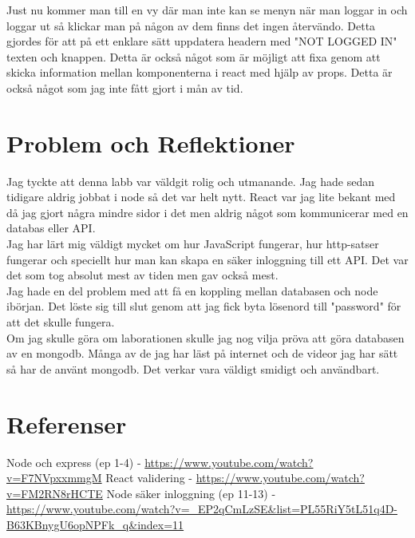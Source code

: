 \documentclass{article}
\begin{document}
\noindent
Just nu kommer man till en vy där man inte kan se menyn när man loggar in och loggar ut så klickar man på någon av dem finns det ingen återvändo. Detta gjordes för att på ett enklare sätt uppdatera headern med "NOT LOGGED IN" texten och knappen. Detta är också något som är möjligt att fixa genom att skicka information mellan komponenterna i react med hjälp av props. Detta är också något som jag inte fått gjort i mån av tid.\\


\section{Problem och Reflektioner}%
\label{sec:problem_och_reflektioner}
Jag tyckte att denna labb var väldgit rolig och utmanande.
Jag hade sedan tidigare aldrig jobbat i node så det var helt nytt.
React var jag lite bekant med då jag gjort några mindre sidor i det 
men aldrig något som kommunicerar med en databas eller API.\\

\noindent
Jag har lärt mig väldigt mycket om hur JavaScript fungerar, hur http-satser fungerar och speciellt hur man kan skapa en säker inloggning till ett API.
Det var det som tog absolut mest av tiden men gav också mest.\\

\noindent
Jag hade en del problem med att få en koppling mellan databasen och node ibörjan. Det löste sig till slut genom att jag fick byta lösenord till "password" för att det skulle fungera.\\

\noindent
Om jag skulle göra om laborationen skulle jag nog vilja pröva att göra databasen av en mongodb. 
Många av de jag har läst på internet och de videor jag har sätt så har de använt mongodb.
Det verkar vara väldigt smidigt och användbart.

\section{Referenser}%
\label{sec:referenser}
Node och express (ep 1-4) - \url{https://www.youtube.com/watch?v=F7NVpxxmmgM}
React validering - \url{https://www.youtube.com/watch?v=FM2RN8rHCTE}\newline
Node säker inloggning (ep 11-13) -\newline
\url{https://www.youtube.com/watch?v=_EP2qCmLzSE&list=PL55RiY5tL51q4D-B63KBnygU6opNPFk_q&index=11}
\end{document}
